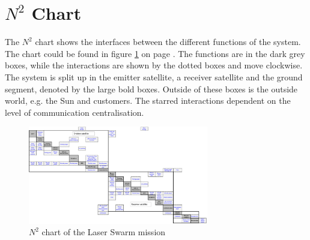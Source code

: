 \section{$N^2$ Chart}
The $N^2$ chart shows the interfaces between the different functions of the system. The chart could be found in figure \ref{fig:n2chart} on page \pageref{fig:n2chart}. The functions are in the dark grey boxes, while the interactions are shown by the dotted boxes and move clockwise. The system is split up in the emitter satellite, a receiver satellite and the ground segment, denoted by the large bold boxes. Outside of these boxes is the outside world, e.g. the Sun and customers. The starred interactions dependent on the level of communication centralisation.

\begin{figure}
\centering
\includegraphics[angle = 90, width = 0.7\textwidth, bb= 0 0 3421px 1861px]{img/N2chart_wo.png} 
\caption{$N^2$ chart of the Laser Swarm mission}
\label{fig:n2chart}
\end{figure}
